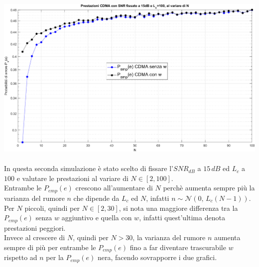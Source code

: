 \begin{adjustbox}{width=.95\paperwidth, center}
	\includegraphics{images/prestazioniCDMA2.png}
\end{adjustbox}\\\\
In questa seconda simulazione è stato scelto di fissare l'\(SNR_{dB}\) a \(15\,dB\) ed \(L_c\) a \(100\) e valutare le prestazioni al variare di \(N\in[2,100]\).\vspace{.3cm}\\
Entrambe le \(P_{emp}(e)\) crescono all'aumentare di \(N\) perchè aumenta sempre più la varianza del rumore \(n\) che dipende da \(L_c\) ed \(N\), infatti \(n\sim\mathcal{N}(0,\,L_c(N-1))\).\\
Per \(N\) piccoli, quindi per \(N\in[2,30]\), si nota una maggiore differenza tra la \(P_{emp}(e)\) senza \(w\) aggiuntivo e quella con \(w\), infatti quest'ultima denota prestazioni peggiori.\\
Invece al crescere di \(N\), quindi per \(N>30\), la varianza del rumore \(n\) aumenta sempre di più per entrambe le \(P_{emp}(e)\) fino a far diventare trascurabile \(w\) rispetto ad \(n\) per la \(P_{emp}(e)\) nera, facendo sovrapporre i due grafici.